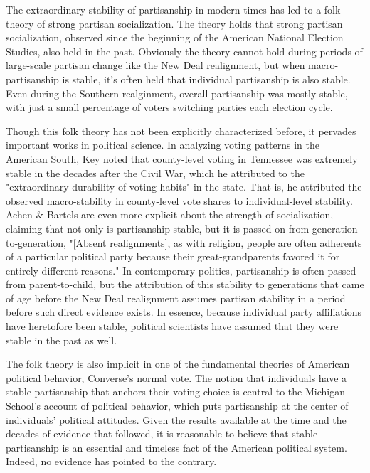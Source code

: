 \documentclass[11pt]{scrartcl}\usepackage[]{graphicx}\usepackage[]{color}
\begin{document}
The extraordinary stability of partisanship in modern times has led to a folk theory of strong partisan socialization. The theory holds that  strong partisan socialization, observed since the beginning of the American National Election Studies, also held in the past. Obviously the theory cannot hold during periods of large-scale partisan change like the New Deal realignment, but when macro-partisanship is stable, it's often held that individual partisanship is also stable. Even during the Southern realginment, overall partisanship was mostly stable, with just a small percentage of voters switching parties each election cycle.

Though this folk theory has not been explicitly characterized before, it pervades important works in political science. In analyzing voting patterns in the American South, Key \citeyearpar{key1949southern} noted that county-level voting in Tennessee was extremely stable in the decades after the Civil War, which he attributed to the "extraordinary durability of voting habits" in the state. That is, he attributed the observed macro-stability in county-level vote shares to individual-level stability. Achen \& Bartels \citeyearpar{achen2016democracy} are even more explicit about the strength of socialization, claiming that not only is partisanship stable, but it is passed on from generation-to-generation, "[Absent realignments], as with religion, people are often adherents of a particular political party because their great-grandparents favored it for entirely different reasons."  In contemporary politics, partisanship is often passed from parent-to-child, but the attribution of this stability to generations that came of age before the New Deal realignment assumes partisan stability in a period before such direct evidence exists. In essence, because individual party affiliations have heretofore been stable, political scientists have assumed that they were stable in the past as well.

The folk theory is also implicit in one of the fundamental theories of American political behavior, Converse's \citeyearpar{converse1966concept} normal vote. The notion that individuals have a stable partisanship that anchors their voting choice is central to the Michigan School's \citeyearpar{campbell1960american} account of political behavior, which puts partisanship at the center of individuals' political attitudes. Given the results available at the time and the decades of evidence that followed, it is reasonable to believe that stable partisanship is an essential and timeless fact of the American political system. Indeed, no evidence has pointed to the contrary.
\end{document}
